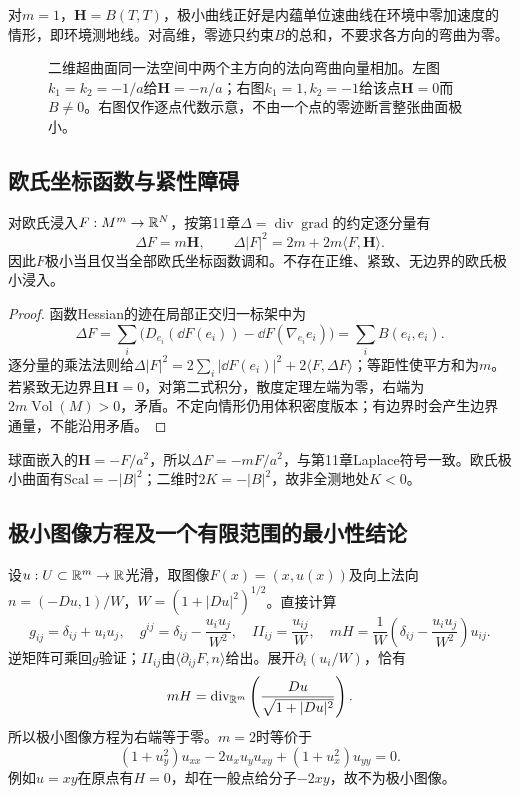 对$m=1$，$\mathbf H=B(T,T)$，极小曲线正好是内蕴单位速曲线在环境中零加速度的情形，即环境测地线。对高维，零迹只约束$B$的总和，不要求各方向的弯曲为零。
\begin{figure}[htbp]
\centering
\caption{二维超曲面同一法空间中两个主方向的法向弯曲向量相加。左图$k_1=k_2=-1/a$给$\mathbf H=-n/a$；右图$k_1=1,k_2=-1$给该点$\mathbf H=0$而$B\ne0$。右图仅作逐点代数示意，不由一个点的零迹断言整张曲面极小。}
\label{fig:mean-curvature-balance}
\end{figure}

\subsection*{欧氏坐标函数与紧性障碍}
\begin{proposition}[浸入向量的Laplace方程]\label{prop:laplace-immersion}
对欧氏浸入$F:M^m\to\mathbb{R}^N$，按第11章$\Delta=\operatorname{div}\operatorname{grad}$的约定逐分量有
\[
 \Delta F=m\mathbf H,\qquad
 \Delta|F|^2=2m+2m\langle F,\mathbf H\rangle.
\]
因此$F$极小当且仅当全部欧氏坐标函数调和。不存在正维、紧致、无边界的欧氏极小浸入。
\end{proposition}
\begin{proof}
函数Hessian的迹在局部正交归一标架中为
\[
 \Delta F=\sum_i\bigl(D_{e_i}(\dd F(e_i))-\dd F(\nabla_{e_i}e_i)\bigr)
          =\sum_i B(e_i,e_i).
\]
逐分量的乘法法则给$\Delta|F|^2=2\sum_i|\dd F(e_i)|^2+2\langle F,\Delta F\rangle$；等距性使平方和为$m$。若紧致无边界且$\mathbf H=0$，对第二式积分，散度定理左端为零，右端为$2m\operatorname{Vol}(M)>0$，矛盾。不定向情形仍用体积密度版本；有边界时会产生边界通量，不能沿用矛盾。
\end{proof}

球面嵌入的$\mathbf H=-F/a^2$，所以$\Delta F=-mF/a^2$，与第11章Laplace符号一致。欧氏极小曲面有$\mathrm{Scal}=-|B|^2$；二维时$2K=-|B|^2$，故非全测地处$K<0$。

\subsection*{极小图像方程及一个有限范围的最小性结论}
设$u:U\subset\mathbb{R}^m\to\mathbb{R}$光滑，取图像$F(x)=(x,u(x))$及向上法向$n=(-Du,1)/W$，$W=(1+|Du|^2)^{1/2}$。直接计算
\[
 g_{ij}=\delta_{ij}+u_i u_j,\quad
 g^{ij}=\delta_{ij}-\frac{u_i u_j}{W^2},\quad
 II_{ij}=\frac{u_{ij}}{W},\quad
 mH=\frac1W\left(\delta_{ij}-\frac{u_i u_j}{W^2}\right)u_{ij}.
\]
逆矩阵可乘回$g$验证；$II_{ij}$由$\langle\partial_{ij}F,n\rangle$给出。展开$\partial_i(u_i/W)$，恰有
\[
 mH=\operatorname{div}_{\mathbb{R}^m}\left(\frac{Du}{\sqrt{1+|Du|^2}}\right).
\]
所以极小图像方程为右端等于零。$m=2$时等价于
\[
 (1+u_y^2)u_{xx}-2u_xu_yu_{xy}+(1+u_x^2)u_{yy}=0.
\]
例如$u=xy$在原点有$H=0$，却在一般点给分子$-2xy$，故不为极小图像。

